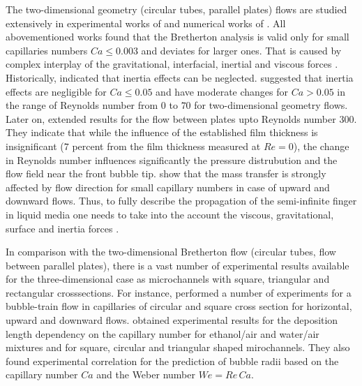 \documentclass{article}
\begin{document}
The two-dimensional geometry (circular tubes, parallel plates) flows are studied extensively in
experimental works of \citet{aussillous-deposition, cerro-bubble-train} and numerical works of
\citet{giavedoni-numerical,heil-bretherton}. All abovementioned works found that the Bretherton
analysis is valid only for small capillaries numbers $Ca\leq 0.003$ and deviates for larger ones.
That is caused by complex interplay of the gravitational,
interfacial, inertial and viscous forces \cite{gupta-review}. Historically, 
\citet{bretherton} indicated that inertia effects can be 
neglected. \citet{giavedoni-numerical} suggested
that
inertia effects
are negligible for $Ca \leq 0.05$ and have moderate changes for $Ca>0.05$ in the range of Reynolds
number from $0$ to $70$ for two-dimensional geometry flows. Later on, \citet{heil-bretherton}
extended
results for the flow between plates upto Reynolds number
$300$. They indicate that while the influence of the established film thickness is insignificant
($7$ percent from the film thickness measured at $Re=0$), the change in Reynolds number 
influences significantly the pressure distrubution and the flow field near the front bubble tip.
\citet{cerro-bubble-train} show that the mass transfer is strongly affected by flow direction for
small capillary numbers in case of upward and downward flows. Thus, to fully describe the
propagation of the semi-infinite finger in liquid media one needs to take into the account the
viscous, gravitational, surface and inertia forces \cite{gupta-review}.  

In comparison with the two-dimensional Bretherton flow  (circular tubes, flow between
parallel
plates), there is a vast number of experimental
results available for the three-dimensional case as microchannels with square, triangular and
rectangular crosssections. For instance, \citet{cerro-bubble-train} performed a number of
experiments for a
bubble-train flow in capillaries of
circular and square cross section for horizontal, upward and downward flows.
\citet{shikazono-square} obtained
experimental
results for the deposition length dependency on the
capillary number for ethanol/air and water/air mixtures and for square, circular and triangular
shaped mirochannels. They also found experimental correlation for the prediction of bubble radii
based on the capillary number $Ca$ and the Weber number $We=Re\,Ca$. 
\end{document}
